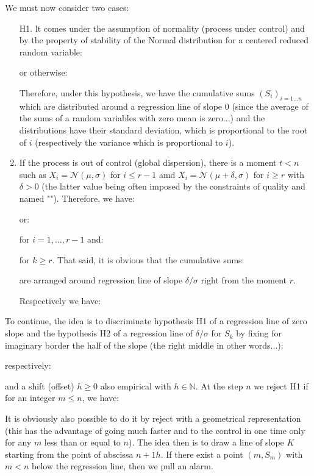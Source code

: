 	We must now consider two cases:
	\begin{enumerate}
		\item[H1.] lt comes under the assumption of normality (process under control) and by the property of stability of the Normal distribution for a centered reduced random variable:
		
		or otherwise:
		
		Therefore, under this hypothesis, we have the cumulative sums $(S_i)_{i=1\ldots n}$ which are distributed around a regression line of slope $0$ (since the average of the sums of a random variables with zero mean is zero...) and the distributions have their standard deviation, which is proportional to the root of $i$ (respectively the variance which is proportional to $i$).
		
		\item If the process is out of control (global dispersion), there is a moment $t<n$ such as $X_i=\mathcal{N}(\mu,\sigma)$ for $i\leq r-1$ amd $X_i=\mathcal{N}(\mu+\delta,\sigma)$ for $i\geq r$ with $\delta>0$ (the latter value being often imposed by the constraints of quality and named ""). Therefore, we have:
		
		or:
		
		for $i=1,\ldots,r-1$ and:
		
		for $k\geq r$. That said, it is obvious that the cumulative sums:
		
		are arranged around regression line of slope $\delta/\sigma$ right from the moment $r$.
	
		Respectively we have:
		
	\end{enumerate}
	To continue, the idea is to discriminate hypothesis H1 of a regression line of zero slope and the hypothesis H2 of a regression line of $\delta/\sigma$ for $S_k$ by fixing for imaginary border the half of the slope (the right middle in other words...):
	
	respectively:
	
	and a shift (offset) $h\geq 0$ also empirical with $h\in \mathbb{N}$. At the step $n$ we reject H1 if for an integer $m\leq n$, we have:
	
	It is obviously also possible to do it by reject with a geometrical representation (this has the advantage of going much faster and to the control in one time only for any $m$ less than or equal to $n$). The idea then is to draw a line of slope $K$ starting from the point of abscissa $n+1h$. If there exist a point $(m,S_m)$ with $m<n$ below the regression line, then we pull an alarm.
	
